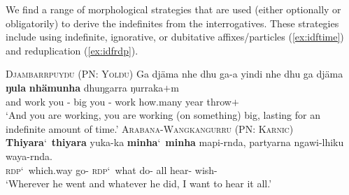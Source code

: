 \documentclass[12pt,egregdoesnotlikesansseriftitles]{scrartcl}
\begin{document}
We find a range of morphological strategies that are used (either optionally or obligatorily) to derive the indefinites from the interrogatives. These strategies include using indefinite, ignorative, or dubitative affixes/particles (\ref{ex:idftime}) and   reduplication (\ref{ex:idfrdp}). %
\begin{exe}
  \ex\label{ex:idftime} \textsc{Djambarrpuyŋu (PN: Yolŋu)}\hfill {}
  \gll %
  Ga djäma nhe dhu ga-a yindi nhe dhu ga djäma \textbf{ŋula} \textbf{nhämunha} dhuŋgarra ŋurraka$+$m\\
  and work you \Fut{} \Impv-\First{} big you \Fut{} \Impv-\First{} work  how.many year throw$+$\First\\
  \glt `And you are working, you are working (on something) big, lasting for an indefinite amount of time.'
  \ex\label{ex:idfrdp} \textsc{Arabana-Wangkangurru (PN: Karnic)}\hfill {}
  \gll \textbf{Thiyara}\char`~\textbf{thiyara} yuka-ka \textbf{minha}\char`~\textbf{minha} mapi-rnda, partyarna ngawi-lhiku waya-rnda.\\
  \textsc{rdp}\char`~which.way go-\Pst{} \textsc{rdp}\char`~what do-\Prs{} all hear-\Purp{} wish-\Prs\\
  \glt `Wherever he went and whatever he did, I want to hear it all.' %
\end{exe}
\end{document}
